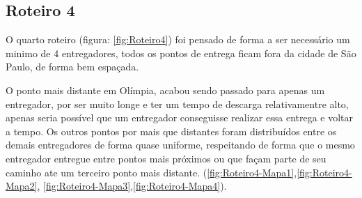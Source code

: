 \begin{center}
	\label{fig:Roteiro3-G1000P100-SwapMutation}
\end{center}


\subsection{Roteiro 4}

O quarto roteiro (figura: \ref{fig:Roteiro4}) foi pensado de forma a ser necessário um minimo de 4 entregadores, todos os pontos de entrega ficam fora da cidade de São Paulo, de forma bem espaçada.

O ponto mais distante em Olímpia, acabou sendo passado para apenas um entregador, por ser muito longe e ter um tempo de descarga relativamentre alto, apenas seria possível que um entregador conseguisse realizar essa entrega e voltar a tempo. Os outros pontos por mais que distantes foram distribuídos entre os demais entregadores de forma quase uniforme, respeitando de forma que o mesmo entregador entregue entre pontos mais próximos ou que façam parte de seu caminho ate um terceiro ponto mais distante. (\ref{fig:Roteiro4-Mapa1},\ref{fig:Roteiro4-Mapa2}, \ref{fig:Roteiro4-Mapa3},\ref{fig:Roteiro4-Mapa4}).



